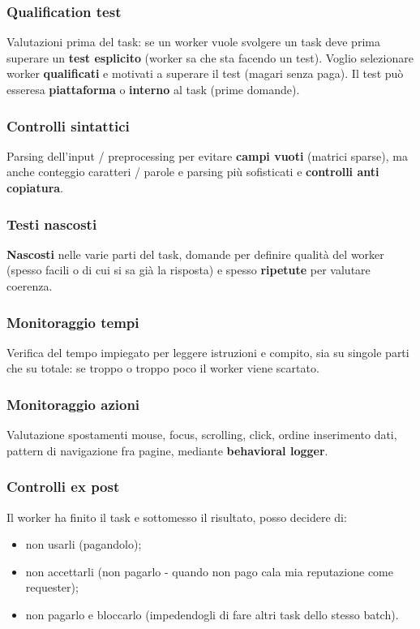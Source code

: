 \documentclass{article}
\begin{document}
    \subsubsection{Qualification test}
      Valutazioni prima del task: se un worker vuole svolgere un task deve prima superare un \textbf{test esplicito} (worker sa che sta facendo un test). Voglio selezionare worker \textbf{qualificati} e motivati a superare il test (magari senza paga). Il test può esseresa \textbf{piattaforma} o \textbf{interno} al task (prime domande).
    \subsubsection{Controlli sintattici}
      Parsing dell'input / preprocessing per evitare \textbf{campi vuoti} (matrici sparse), ma anche conteggio caratteri / parole e parsing più sofisticati e \textbf{controlli anti copiatura}.
    \subsubsection{Testi nascosti}
      \textbf{Nascosti} nelle varie parti del task, domande per definire qualità del worker (spesso facili o di cui si sa già la risposta) e spesso \textbf{ripetute} per valutare coerenza.
    \subsubsection{Monitoraggio tempi}
      Verifica del tempo impiegato per leggere istruzioni e compito, sia su singole parti che su totale: se troppo o troppo poco il worker viene scartato.
    \subsubsection{Monitoraggio azioni}
      Valutazione spostamenti mouse, focus, scrolling, click, ordine inserimento dati, pattern di navigazione fra pagine, mediante \textbf{behavioral logger}.
    \subsubsection{Controlli ex post}
      Il worker ha finito il task e sottomesso il risultato, posso decidere di:
      \begin{itemize}
          \item non usarli (pagandolo);
          \item non accettarli (non pagarlo - quando non pago cala mia reputazione come requester);
          \item non pagarlo e bloccarlo (impedendogli di fare altri task dello stesso batch).
      \end{itemize}
\end{document}
